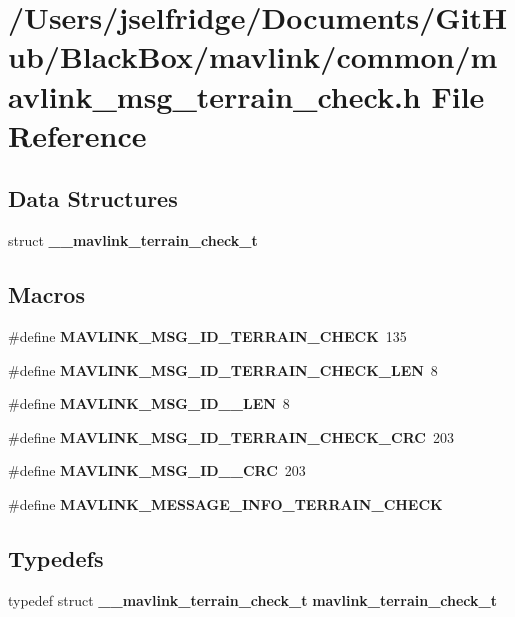 \section{/\+Users/jselfridge/\+Documents/\+Git\+Hub/\+Black\+Box/mavlink/common/mavlink\+\_\+msg\+\_\+terrain\+\_\+check.h File Reference}
\label{mavlink__msg__terrain__check_8h}
\subsection*{Data Structures}
\begin{DoxyCompactItemize}
\item 
struct \textbf{ \+\_\+\+\_\+mavlink\+\_\+terrain\+\_\+check\+\_\+t}
\end{DoxyCompactItemize}
\subsection*{Macros}
\begin{DoxyCompactItemize}
\item 
\#define \textbf{ M\+A\+V\+L\+I\+N\+K\+\_\+\+M\+S\+G\+\_\+\+I\+D\+\_\+\+T\+E\+R\+R\+A\+I\+N\+\_\+\+C\+H\+E\+CK}~135
\item 
\#define \textbf{ M\+A\+V\+L\+I\+N\+K\+\_\+\+M\+S\+G\+\_\+\+I\+D\+\_\+\+T\+E\+R\+R\+A\+I\+N\+\_\+\+C\+H\+E\+C\+K\+\_\+\+L\+EN}~8
\item 
\#define \textbf{ M\+A\+V\+L\+I\+N\+K\+\_\+\+M\+S\+G\+\_\+\+I\+D\+\_\+\_\+\+L\+EN}~8
\item 
\#define \textbf{ M\+A\+V\+L\+I\+N\+K\+\_\+\+M\+S\+G\+\_\+\+I\+D\+\_\+\+T\+E\+R\+R\+A\+I\+N\+\_\+\+C\+H\+E\+C\+K\+\_\+\+C\+RC}~203
\item 
\#define \textbf{ M\+A\+V\+L\+I\+N\+K\+\_\+\+M\+S\+G\+\_\+\+I\+D\+\_\+\_\+\+C\+RC}~203
\item 
\#define \textbf{ M\+A\+V\+L\+I\+N\+K\+\_\+\+M\+E\+S\+S\+A\+G\+E\+\_\+\+I\+N\+F\+O\+\_\+\+T\+E\+R\+R\+A\+I\+N\+\_\+\+C\+H\+E\+CK}
\end{DoxyCompactItemize}
\subsection*{Typedefs}
\begin{DoxyCompactItemize}
\item 
typedef struct \textbf{ \+\_\+\+\_\+mavlink\+\_\+terrain\+\_\+check\+\_\+t} \textbf{ mavlink\+\_\+terrain\+\_\+check\+\_\+t}
\end{DoxyCompactItemize}


